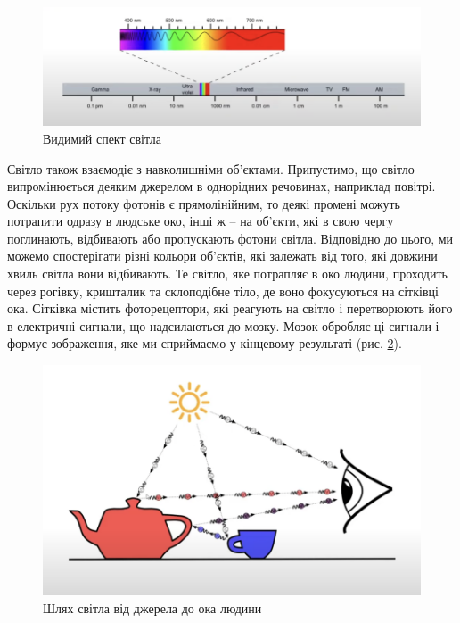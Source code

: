 \begin{figure}[h]
\centering
\includegraphics[scale=1]{Pictures/LightSpec.png}
\caption{Видимий спект світла}
\label{fig:LightSpectrum}
\end{figure}

  \par Світло також взаємодіє з навколишніми об'єктами. Припустимо, що світло випромінюється деяким джерелом в однорідних речовинах, наприклад по\-віт\-рі. Оскільки
  рух потоку фотонів є прямолінійним, то деякі промені можуть потрапити одразу в людське око, інші ж -- на об'єкти, які в свою чергу поглинають, відбивають або
  пропускають фотони світла. Відповідно до цього, ми можемо спостерігати різні кольори об'єктів, які залежать від того, які довжини хвиль світла вони відбивають.
  Те світло, яке потрапляє в око людини, проходить через рогівку, кришталик та склоподібне тіло, де воно фокусуються на сітківці ока. Сітківка містить фоторецептори, 
  які реагують на світло і перетворюють його в електричні сигнали, що надсилаються до мозку. Мозок обробляє ці сигнали і формує зображення, яке ми сприймаємо у кінцевому результаті (рис. \ref{fig:LightPath}).

 \begin{figure}[h]
  \centering
  \includegraphics[scale=1]{Pictures/LightPath.png}
  \caption{Шлях світла від джерела до ока людини}
  \label{fig:LightPath}
\end{figure}

